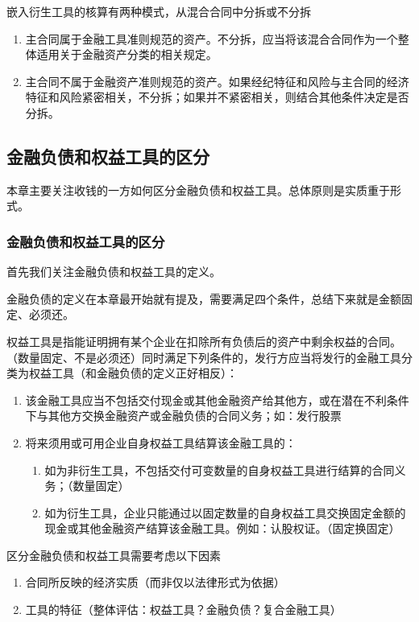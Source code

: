 \documentclass[UTF8,12pt]{ctexart}
\numberwithin{equation}{section} %
\numberwithin{figure}{section}
\numberwithin{table}{section}
\begin{document}
	嵌入衍生工具的核算有两种模式，从混合合同中分拆或不分拆
	\begin{enumerate}
		\item 主合同属于金融工具准则规范的资产。不分拆，应当将该混合合同作为一个整体适用关于金融资产分类的相关规定。
		
		\item 主合同不属于金融资产准则规范的资产。如果经纪特征和风险与主合同的经济特征和风险紧密相关，不分拆；如果并不紧密相关，则结合其他条件决定是否分拆。
	\end{enumerate}
	
	\subsection{金融负债和权益工具的区分}
	本章主要关注收钱的一方如何区分金融负债和权益工具。总体原则是实质重于形式。
	
	\subsubsection{金融负债和权益工具的区分}
	首先我们关注金融负债和权益工具的定义。
	
	金融负债的定义在本章最开始就有提及，需要满足四个条件，总结下来就是金额固定、必须还。
	

	权益工具是指能证明拥有某个企业在扣除所有负债后的资产中剩余权益的合同。（数量固定、不是必须还）同时满足下列条件的，发行方应当将发行的金融工具分类为权益工具（和金融负债的定义正好相反）：
	\begin{enumerate}
		\item 该金融工具应当不包括交付现金或其他金融资产给其他方，或在潜在不利条件下与其他方交换金融资产或金融负债的合同义务；如：发行股票
		
		\item 将来须用或可用企业自身权益工具结算该金融工具的：
		\begin{enumerate}
			\item 如为非衍生工具，不包括交付可变数量的自身权益工具进行结算的合同义务；（数量固定）
			
			\item 如为衍生工具，企业只能通过以固定数量的自身权益工具交换固定金额的现金或其他金融资产结算该金融工具。例如：认股权证。（固定换固定）
		\end{enumerate}
	\end{enumerate}

	区分金融负债和权益工具需要考虑以下因素
	\begin{enumerate}
		\item 合同所反映的经济实质（而非仅以法律形式为依据）
		
		\item 工具的特征（整体评估：权益工具？金融负债？复合金融工具）
	\end{enumerate}
	
\end{document}
